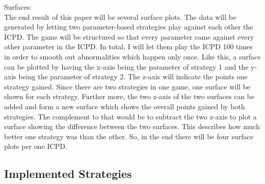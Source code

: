 \documentclass{article}
\begin{document}
Surfaces:\\

The end result of this paper will be several surface plots.
The data will be generated by letting two parameter-based strategies play against each other the ICPD.
The game will be structured so that every parameter came against every other parameter in the ICPD.
In total, I will let them play the ICPD 100 times in order to smooth out abnormalities which happen only once.
Like this, a surface can be plotted by having the x-axis being the parameter of strategy 1 and the y-axis being the parameter of strategy 2.
The z-axis will indicate the points one strategy gained.
Since there are two strategies in one game, one surface will be shown for each strategy.
Further more, the two z-axis of the two surfaces can be added and form a new surface which shows the overall points gained by both strategies.
The complement to that would be to subtract the two z-axis to plot a surface showing the difference between the two surfaces.
This describes how much better one strategy was than the other.
So, in the end there will be four surface plots per one ICPD.


\subsection{Implemented Strategies}
	
\end{document}
